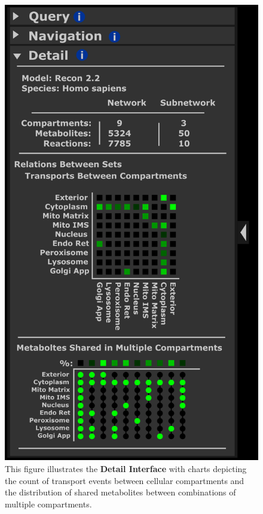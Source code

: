 \begin{figure}[htbp]
\includegraphics[scale=1]{sketch_2017-01-02_4}
\centering
\caption{This figure illustrates the \textbf{Detail Interface} with charts depicting the count of transport events between cellular compartments and the distribution of shared metabolites between combinations of multiple compartments.}
\label{fig:2017-01-02_4}
\end{figure}

